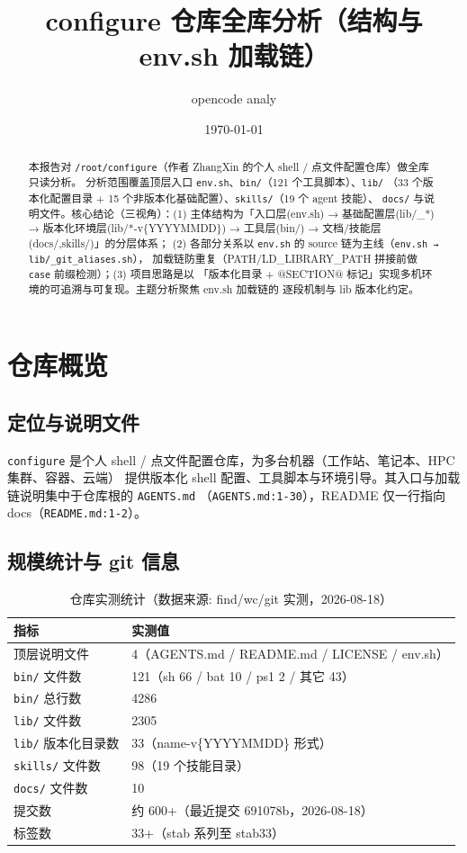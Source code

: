 \documentclass[UTF8]{ctexart}
\title{configure 仓库全库分析（结构与 env.sh 加载链）}
\author{opencode analy}
\date{\today}
\begin{document}
\maketitle

\begin{abstract}
本报告对 \texttt{/root/configure}（作者 ZhangXin 的个人 shell / 点文件配置仓库）做全库只读分析。
分析范围覆盖顶层入口 \texttt{env.sh}、\texttt{bin/}（121 个工具脚本）、\texttt{lib/}
（33 个版本化配置目录 + 15 个非版本化基础配置）、\texttt{skills/}（19 个 agent 技能）、
\texttt{docs/} 与说明文件。核心结论（三视角）：(1) 主体结构为「入口层(env.sh) → 基础配置层(lib/\_*) →
版本化环境层(lib/*-v\{YYYYMMDD\}) → 工具层(bin/) → 文档/技能层(docs/,skills/)」的分层体系；
(2) 各部分关系以 \texttt{env.sh} 的 source 链为主线（\texttt{env.sh → lib/\_git\_aliases.sh}），
加载链防重复（PATH/LD\_LIBRARY\_PATH 拼接前做 \texttt{case} 前缀检测）；(3) 项目思路是以
「版本化目录 + @SECTION@ 标记」实现多机环境的可追溯与可复现。主题分析聚焦 env.sh 加载链的
逐段机制与 lib 版本化约定。
\end{abstract}

\tableofcontents

\section{仓库概览}
\subsection{定位与说明文件}
\texttt{configure} 是个人 shell / 点文件配置仓库，为多台机器（工作站、笔记本、HPC 集群、容器、云端）
提供版本化 shell 配置、工具脚本与环境引导。其入口与加载链说明集中于仓库根的 \texttt{AGENTS.md}
（\texttt{\nolinkurl{AGENTS.md:1-30}}），README 仅一行指向 docs（\texttt{\nolinkurl{README.md:1-2}}）。

\subsection{规模统计与 git 信息}
\begin{table}[htbp]\centering
\begin{tabular}{ll}
\toprule
指标 & 实测值 \\
\midrule
顶层说明文件 & 4（AGENTS.md / README.md / LICENSE / env.sh） \\
\texttt{bin/} 文件数 & 121（sh 66 / bat 10 / ps1 2 / 其它 43） \\
\texttt{bin/} 总行数 & 4286 \\
\texttt{lib/} 文件数 & 2305 \\
\texttt{lib/} 版本化目录数 & 33（name-v\{YYYYMMDD\} 形式） \\
\texttt{skills/} 文件数 & 98（19 个技能目录） \\
\texttt{docs/} 文件数 & 10 \\
提交数 & 约 600+（最近提交 691078b，2026-08-18） \\
标签数 & 33+（stab 系列至 stab33） \\
\bottomrule
\end{tabular}
\caption{仓库实测统计（数据来源: find/wc/git 实测，2026-08-18）}
\end{table}
\end{document}
